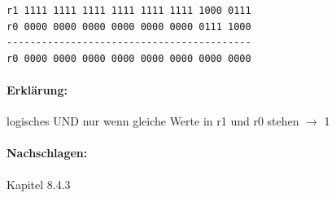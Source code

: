 \documentclass[12pt,twoside,a4paper]{article}
\begin{document}
\begin{lstlisting}
r1 1111 1111 1111 1111 1111 1111 1000 0111
r0 0000 0000 0000 0000 0000 0000 0111 1000
------------------------------------------
r0 0000 0000 0000 0000 0000 0000 0000 0000
\end{lstlisting}

\paragraph*{Erklärung:}
logisches UND nur wenn gleiche Werte in r1 und r0 stehen $\rightarrow$ 1

\paragraph*{Nachschlagen:}
Kapitel 8.4.3
\end{document}
